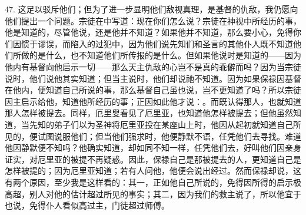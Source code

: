 47. 这足以驳斥他们；但为了进一步显明他们敌视真理，是基督的仇敌，我仍愿向他们提出一个问题。宗徒在中写道：现在你们怎么说？宗徒在神视中所经历的事，他是知道的，尽管他说，还是他并不知道？如果他并不知道，那么要小心，免得你们因惯于谬误，而陷入的过犯中，因为他们说先知们和圣言的其他仆人既不知道他们所做的是什么，也不知道他们所传报的是什么。但如果他说时是知道的——因为他内有基督向他启示一切——那么天主仇敌的心岂不是真的乖僻而吗？因为当宗徒说时，他们说他其实知道；但当主说时，他们却说祂不知道。因为如果保禄因基督在他内，便知道自己所说的事，那么基督自己虽也说，岂不更知道了吗？所以宗徒因主启示给他，知道他所经历的事；正因如此他才说：。而既认得那人，也就知道那人怎样被提去。同样，厄里叟看见了厄里亚，也知道他怎样被提去；但他虽然知道，当先知的弟子们以为圣神将厄里亚投在某座山上时，他因从起初就知道自己所见的，便试图说服他们；但当他们强求时，他便静默不语，任凭他们去寻找。难道他因静默便不知吗？他确实知道，却如同不知一样，任凭他们去，好叫他们因亲身证实，对厄里亚的被提不再疑惑。因此，保禄自己是那被提去的人，更知道自己是怎样被提的；因为厄里亚知道；若有人问他，他便会说出经过。然而保禄却说，这有两个原因，至少我是这样看的：其一，正如他自己所说的，免得因所得的启示极高超，别人对他的估计超过所见的事实；其二，因为我们的救主说了，所以他宜于也说，免得仆人看似高过主，门徒超过师傅。\par

